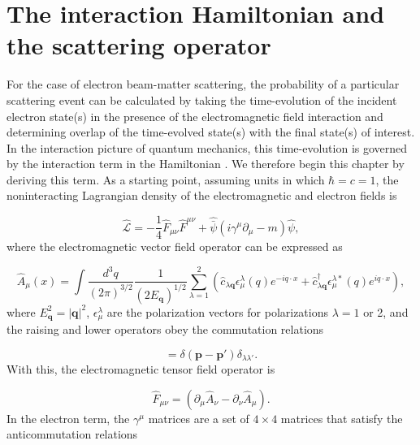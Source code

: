 \documentclass{article}
\begin{document}
\section{The interaction Hamiltonian and the scattering operator}
\label{app:S}

For the case of electron beam-matter scattering, the probability of a particular scattering event can be calculated by taking the time-evolution of the incident electron state(s) in the presence of the electromagnetic field interaction and determining overlap of the time-evolved state(s) with the final state(s) of interest. In the interaction picture of quantum mechanics, this time-evolution is governed by the interaction term in the Hamiltonian \cite{Sakurai2011}.  We therefore begin this chapter by deriving this term.  As a starting point, assuming units in which $\hbar = c = 1$, the noninteracting Lagrangian density of the electromagnetic and electron fields is

\begin{equation}
\label{eq:nonIntL}
    \hat{\mathcal{L}}
    =
    -\frac{1}{4}\hat{F}_{\mu\nu}\hat{F}^{\mu\nu}
    +
    \hat{\bar{\psi}}(i\gamma^\mu \partial_\mu - m)\hat{\psi},
\end{equation}
%
where the electromagnetic vector field operator can be expressed as

\begin{equation}
    \hat{A}_\mu(x)
    =
    \int\frac{d^3q}{(2\pi)^{3/2}}\frac{1}{(2E_\mathbf{q})^{1/2}}
    \sum_{\lambda=1}^2
    \left(
    \hat{c}_{\lambda\mathbf{q}}\epsilon^\lambda_\mu(q)e^{-iq\cdot x}
    +
    \hat{c}^\dag_{\lambda\mathbf{q}}\epsilon^{\lambda*}_\mu(q)e^{iq\cdot x}
    \right),
\end{equation}
%
where $E_\mathbf{q}^2 = |\mathbf{q}|^2$, $\epsilon^\lambda_\mu$ are the polarization vectors for polarizations $\lambda=1$ or 2, and the raising and lower operators obey the commutation relations

\begin{equation}
    [\hat{c}_{\lambda\mathbf{p}}, \hat{c}^\dag_{\lambda'\mathbf{p}'}]
    =
    \delta(\mathbf{p} - \mathbf{p'})\delta_{\lambda\lambda'}.
\end{equation}
%
With this, the electromagnetic tensor field operator is

\begin{equation}
    \hat{F}_{\mu\nu} = (\partial_\mu \hat{A}_\nu - \partial_\nu \hat{A}_\mu).
\end{equation}
%
In the electron term, the $\gamma^\mu$ matrices are a set of $4\times4$ matrices that satisfy the anticommutation relations
\end{document}

